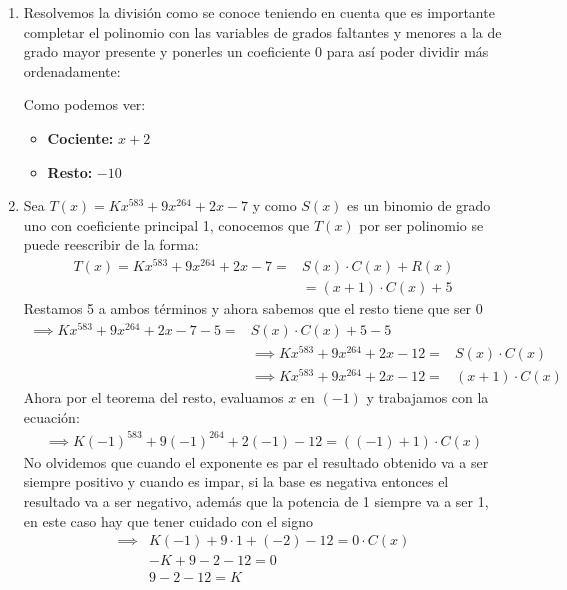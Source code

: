 \documentclass[11pt]{article}
\begin{document}
\begin{enumerate}
\begin{enumerate}
        \item Resolvemos la división como se conoce teniendo en cuenta que es importante completar el polinomio con las variables de grados faltantes y menores a la de grado mayor presente y ponerles un coeficiente 0 para así poder dividir más ordenadamente:
        \begin{center}
        \end{center}
        Como podemos ver:
        \begin{itemize}
            \item \textbf{Cociente:} $x+2$
            \item \textbf{Resto:} $-10$
        \end{itemize}
        \item Sea $T(x)=Kx^{583}+9x^{264}+2x-7$ y como $S(x)$ es un binomio de grado uno con coeficiente principal 1, conocemos que $T(x)$ por ser polinomio se puede reescribir de la forma:
        \begin{align*}
            T(x)=Kx^{583}+9x^{264}+2x-7=& S(x) \cdot C(x) + R(x)\\
            &=(x+1)\cdot C(x)+5
        \end{align*}
        Restamos 5 a ambos términos y ahora sabemos que el resto tiene que ser 0
        \begin{align*}
            \implies Kx^{583}+9x^{264}+2x-7-5=& S(x) \cdot C(x) + 5-5\\
            &\implies Kx^{583}+9x^{264}+2x-12=& S(x) \cdot C(x) \\
            &\implies Kx^{583}+9x^{264}+2x-12=& (x+1) \cdot C(x) 
        \end{align*}
        Ahora por el teorema del resto, evaluamos $x$ en $(-1)$ y trabajamos con la ecuación:
        \begin{align*}
            \implies K(-1)^{583}+9(-1)^{264}+2(-1)-12= ((-1)+1) \cdot C(x)
        \end{align*}
        No olvidemos que cuando el exponente es par el resultado obtenido va a ser siempre positivo y cuando es impar, si la base es negativa entonces el resultado va a ser negativo, además que la potencia de 1 siempre va a ser 1, en este caso hay que tener cuidado con el signo
        \begin{align*}
            \implies & K(-1)+9\cdot 1+(-2)-12= 0 \cdot C(x)\\
            &-K+9-2-12=0\\
            &9-2-12=K\\

\end{align*}
\end{enumerate}
\end{enumerate}
\end{document}
